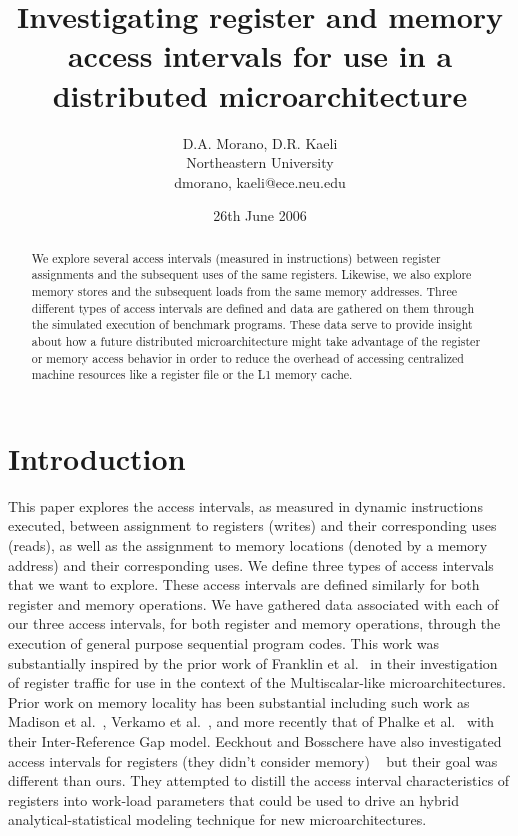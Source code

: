 \documentclass[10pt,dvips]{article}
\begin{document}
%
%
%
\title{Investigating register and memory access intervals for use in a
distributed microarchitecture}
%
%
\author{
D.A. Morano, D.R. Kaeli\\
Northeastern University\\
{dmorano, kaeli}@ece.neu.edu
}
%
%
\date{26th June 2006}
%
\maketitle
%
%
%
\begin{abstract}
%
We explore several access intervals (measured in instructions) between
register assignments and the subsequent uses of the same registers.
Likewise, we also explore memory stores and the subsequent loads from
the same memory addresses.  Three different types of access intervals
are defined and data are gathered on them through the simulated execution
of benchmark programs.  These data serve to provide insight about how a
future distributed microarchitecture might take advantage of the register
or memory access behavior in order to reduce the overhead of accessing
centralized machine resources like a register file or the L1 memory cache.
%
\end{abstract}
%
%
\section{Introduction}
%
This paper explores the access intervals, as measured in dynamic 
instructions executed, between assignment to
registers (writes) and their corresponding uses (reads),
as well as the
assignment to memory locations (denoted by a memory address) and their 
corresponding uses.
We define three types of access intervals that we want to explore.
These access intervals are defined similarly for both register 
and
memory operations.
We have gathered data associated with each of our three access
intervals, for both register and memory operations, 
through the execution of general purpose sequential
program codes.
This work was substantially inspired by the prior work 
of Franklin et al.~\cite{Franklin92}
in their investigation of register traffic
for use in the context of the Multiscalar-like microarchitectures.
Prior work on memory locality has been substantial including
such work as Madison et al.~\cite{madison76characteristics},
Verkamo et al.~\cite{verkamo85emperical}, and more recently
that of Phalke et al.~\cite{phalke95gap} with their Inter-Reference
Gap model.
Eeckhout and Bosschere have also investigated access intervals
for registers (they didn't consider memory)
~\cite{eeckhout01hybrid} but their goal was different than ours.
They attempted to distill the access interval characteristics
of registers
into work-load parameters that could be used to drive an hybrid
analytical-statistical modeling technique for new microarchitectures.
\end{document}
